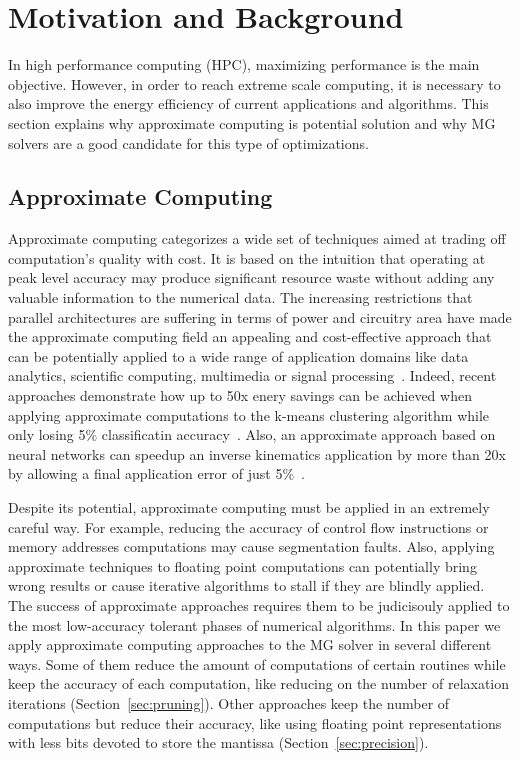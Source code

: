 \section{Motivation and Background}
\label{sec:motivation}

In high performance computing (HPC), maximizing performance is the main
objective. However, in order to reach extreme scale computing, it is necessary
to also improve the energy efficiency of current applications and algorithms.
This section explains why approximate computing is potential solution and why
MG solvers are a good candidate for this type of optimizations.

\subsection{Approximate Computing}
\label{sec:approx}


Approximate computing categorizes a wide set of techniques aimed at trading off computation's quality with cost.
It is based on the intuition that operating at peak level accuracy may produce significant resource waste without adding any valuable information to the numerical data.
The increasing restrictions that parallel architectures are suffering in terms of power and circuitry area have made the approximate computing field an appealing and cost-effective approach that can be potentially applied to a wide range of application domains like data analytics, scientific computing, multimedia or signal
processing~\cite{Mittal2016}.
Indeed, recent approaches demonstrate how up to 50x enery savings can be achieved when applying approximate computations to the k-means clustering algorithm while only losing 5\% classificatin accuracy~\cite{Chippa2013}.
Also, an approximate approach based on neural networks can speedup an inverse kinematics application by more than 20x by allowing a final application error of just 5\%~\cite{Grigorian2015}.

Despite its potential, approximate computing must be applied in an extremely careful way.
For example, reducing the accuracy of control flow instructions or memory addresses computations may cause segmentation faults.
Also, applying approximate techniques to floating point computations can potentially bring wrong results or cause iterative algorithms to stall if they are blindly applied.
The success of approximate approaches requires them to be judicisouly applied to the most low-accuracy tolerant phases of numerical algorithms.
In this paper we apply approximate computing approaches to the MG solver in several different ways.
Some of them reduce the amount of computations of certain routines while keep the accuracy of each computation, like reducing on the number of relaxation iterations (Section~\ref{sec:pruning}).
Other approaches keep the number of computations but reduce their accuracy, like using floating point representations with less bits devoted to store the mantissa (Section~\ref{sec:precision}).

